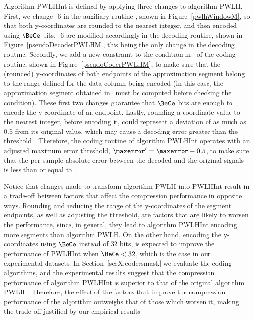Algorithm PWLHInt is defined by applying three changes to algorithm PWLH. First, we change -6 in the auxiliary routine \EncodeWindow, shown in Figure~\ref{pwlhWindowM}, so that both y-coordinates are rounded to the nearest integer, and then encoded using $\BeCe$ bits. -6 are modified accordingly in the decoding routine, shown in Figure~\ref{pseudoDecoderPWLHM}, this being the only change in the decoding routine. Secondly, we add a new constraint to the condition in \condLinePWLH\ of the coding routine, shown in Figure~\ref{pseudoCoderPWLHM}, to make sure that the (rounded) y-coordinates of both endpoints of the approximation segment belong to the range defined for the data column being encoded (in this case, the approximation segment obtained in \EncodeWindow\ must be computed before checking the condition). These first two changes guarantee that $\BeCe$ bits are enough to encode the y-coordinate of an endpoint. Lastly, rounding a coordinate value to the nearest integer, before encoding it, could represent a deviation of as much as 0.5 from its original value, which may cause a decoding error greater than the threshold \maxerror. Therefore, the coding routine of algorithm PWLHInt operates with an adjusted maximum error threshold, $\maxerror' = \maxerror - 0.5$, to make sure that the per-sample absolute error between the decoded and the original signals is less than or equal to \maxerror. 


\clearpage


Notice that changes made to transform algorithm PWLH into PWLHInt result in a trade-off between factors that affect the compression performance in opposite ways. Rounding and reducing the range of the y-coordinates of the segment endpoints, as well as adjusting the threshold, are factors that are likely to worsen the performance, since, in general, they lead to algorithm PWLHInt encoding more segments than algorithm PWLH. On the other hand, encoding the y-coordinates using $\BeCe$ instead of 32 bits, is expected to improve the performance of PWLHInt when $\BeCe < 32$, which is the case in our experimental datasets. In Section~\ref{secX:codersmask} we evaluate the coding algorithms, and the experimental results suggest that the compression performance of algorithm PWLHInt is superior to that of the original algorithm PWLH \cite{coder:pwlh}. Therefore, the effect of the factors that improve the compression performance of the algorithm outweighs that of those which worsen it, making the trade-off justified by our empirical results


